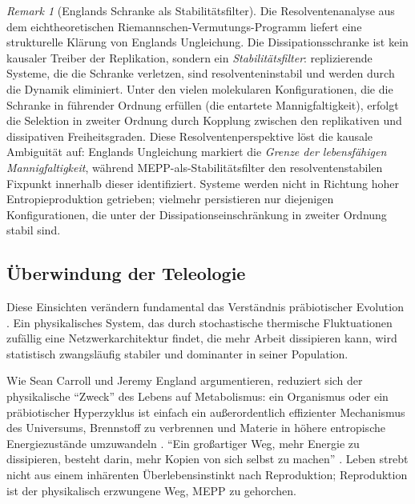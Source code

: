 \documentclass[12pt,a4paper]{article}
\theoremstyle{remark}
\newtheorem{remark}{Remark}
\begin{document}
\begin{remark}[Englands Schranke als Stabilit\"atsfilter]
\label{rem:england-stability-filter}
Die Resolventenanalyse aus dem eichtheoretischen Riemannschen-Vermutungs-Programm \citep{GeigerRH2026b} liefert eine strukturelle Kl\"arung von Englands Ungleichung. Die Dissipationsschranke ist kein kausaler Treiber der Replikation, sondern ein \emph{Stabilit\"atsfilter}: replizierende Systeme, die die Schranke verletzen, sind resolventeninstabil und werden durch die Dynamik eliminiert. Unter den vielen molekularen Konfigurationen, die die Schranke in f\"uhrender Ordnung erf\"ullen (die entartete Mannigfaltigkeit), erfolgt die Selektion in zweiter Ordnung durch Kopplung zwischen den replikativen und dissipativen Freiheitsgraden. Diese Resolventenperspektive l\"ost die kausale Ambiguit\"at auf: Englands Ungleichung markiert die \emph{Grenze der lebensfähigen Mannigfaltigkeit}, w\"ahrend MEPP-als-Stabilit\"atsfilter den resolventenstabilen Fixpunkt innerhalb dieser identifiziert. Systeme werden nicht in Richtung hoher Entropieproduktion getrieben; vielmehr persistieren nur diejenigen Konfigurationen, die unter der Dissipationseinschr\"ankung in zweiter Ordnung stabil sind.
\end{remark}

\subsection{\"Uberwindung der Teleologie}

Diese Einsichten ver\"andern fundamental das Verst\"andnis pr\"abiotischer Evolution \citep{UnbecomingBeing}. Ein physikalisches System, das durch stochastische thermische Fluktuationen zuf\"allig eine Netzwerkarchitektur findet, die mehr Arbeit dissipieren kann, wird statistisch zwangsl\"aufig stabiler und dominanter in seiner Population.

Wie Sean Carroll und Jeremy England argumentieren, reduziert sich der physikalische ``Zweck'' des Lebens auf Metabolismus: ein Organismus oder ein pr\"abiotischer Hyperzyklus ist einfach ein au\ss{}erordentlich effizienter Mechanismus des Universums, Brennstoff zu verbrennen und Materie in h\"ohere entropische Energiezust\"ande umzuwandeln \citep{UnbecomingBeing}. ``Ein gro\ss{}artiger Weg, mehr Energie zu dissipieren, besteht darin, mehr Kopien von sich selbst zu machen'' \citep{OvershootLoop}. Leben strebt nicht aus einem inh\"arenten \"Uberlebensinstinkt nach Reproduktion; Reproduktion ist der physikalisch erzwungene Weg, MEPP zu gehorchen.
\end{document}
